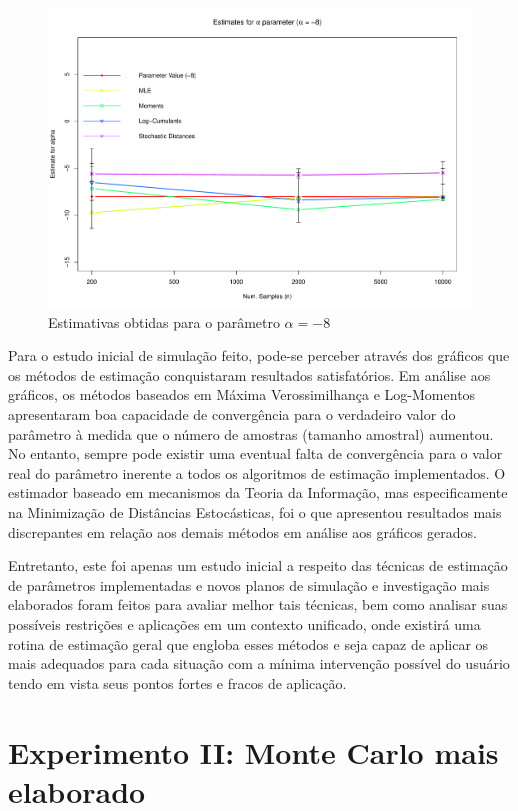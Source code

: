 \begin{figure}[H]
     \centering
     \includegraphics[scale=0.5]{plots/ComparisonAlpha-8.pdf}
     \caption{Estimativas obtidas para o parâmetro $\alpha = -8$}
     \label{graf_7}
\end{figure}

Para o estudo inicial de simulação feito, pode-se perceber através dos gráficos que os métodos de estimação conquistaram resultados satisfatórios. Em análise aos gráficos, os métodos baseados em Máxima Verossimilhança e Log-Momentos apresentaram boa capacidade de convergência para o verdadeiro valor do parâmetro à medida que o número de amostras (tamanho amostral) aumentou. No entanto, sempre pode existir uma eventual falta de convergência para o valor real do parâmetro inerente a todos os algoritmos de estimação implementados. O estimador baseado em mecanismos da Teoria da Informação, mas especificamente na Minimização de Distâncias Estocásticas, foi o que apresentou resultados mais discrepantes em relação aos demais métodos em análise aos gráficos gerados.

Entretanto, este foi apenas um estudo inicial a respeito das técnicas de estimação de parâmetros implementadas e  novos planos de simulação e investigação mais elaborados foram feitos para avaliar melhor tais técnicas, bem como analisar suas possíveis restrições e aplicações em um contexto unificado, onde existirá uma rotina de estimação geral que engloba esses métodos e seja capaz de aplicar os mais adequados para cada situação com a mínima intervenção possível do usuário tendo em vista seus pontos fortes e fracos de aplicação.

\section{Experimento II: Monte Carlo mais elaborado}

